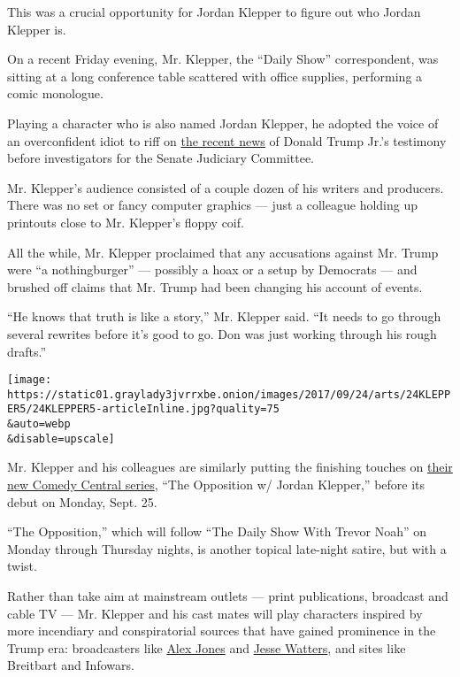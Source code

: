 This was a crucial opportunity for Jordan Klepper to figure out who
Jordan Klepper is.

On a recent Friday evening, Mr. Klepper, the ``Daily Show''
correspondent, was sitting at a long conference table scattered with
office supplies, performing a comic monologue.

Playing a character who is also named Jordan Klepper, he adopted the
voice of an overconfident idiot to riff on
\href{https://www.nytimes3xbfgragh.onion/2017/09/07/us/politics/trump-russia-investigation.html?mcubz=3}{the
recent news} of Donald Trump Jr.'s testimony before investigators for
the Senate Judiciary Committee.

Mr. Klepper's audience consisted of a couple dozen of his writers and
producers. There was no set or fancy computer graphics --- just a
colleague holding up printouts close to Mr. Klepper's floppy coif.

All the while, Mr. Klepper proclaimed that any accusations against Mr.
Trump were ``a nothingburger'' --- possibly a hoax or a setup by
Democrats --- and brushed off claims that Mr. Trump had been changing
his account of events.

``He knows that truth is like a story,'' Mr. Klepper said. ``It needs to
go through several rewrites before it's good to go. Don was just working
through his rough drafts.''

\texttt{[image: https://static01.graylady3jvrrxbe.onion/images/2017/09/24/arts/24KLEPPER5/24KLEPPER5-articleInline.jpg?quality=75\\\&auto=webp\\\&disable=upscale]}

Mr. Klepper and his colleagues are similarly putting the finishing
touches on
\href{https://www.nytimes3xbfgragh.onion/2017/04/04/arts/television/jordan-klepper-the-daily-show-comedy-central-program-of-his-own.html?mcubz=3}{their
new Comedy Central series}, ``The Opposition w/ Jordan Klepper,'' before
its debut on Monday, Sept. 25.

``The Opposition,'' which will follow ``The Daily Show With Trevor
Noah'' on Monday through Thursday nights, is another topical late-night
satire, but with a twist.

Rather than take aim at mainstream outlets --- print publications,
broadcast and cable TV --- Mr. Klepper and his cast mates will play
characters inspired by more incendiary and conspiratorial sources that
have gained prominence in the Trump era: broadcasters like
\href{https://www.nytimes3xbfgragh.onion/2017/06/17/opinion/sunday/the-danger-of-ignoring-alex-jones.html?mcubz=3}{Alex
Jones} and
\href{https://www.nytimes3xbfgragh.onion/2017/04/27/business/media/jesse-watters-ivanka-trump.html}{Jesse
Watters}, and sites like Breitbart and Infowars.

